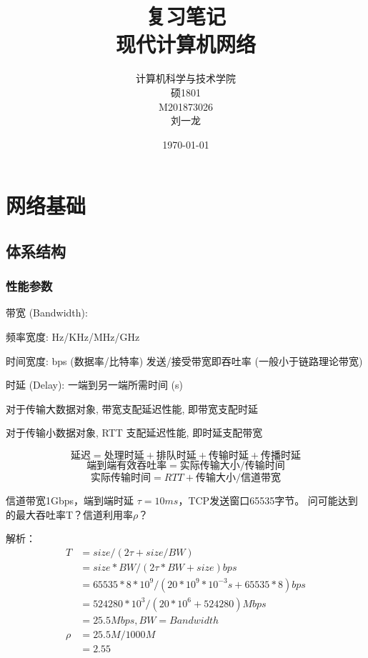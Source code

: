 \documentclass[UTF8,cs4size]{ctexart}
\title{复习笔记 \\ \bigskip \textbf{现代计算机网络}}
\author{计算机科学与技术学院\\ 硕1801\\ M201873026\\ 刘一龙}
\date{\today}
\begin{document}
\maketitle
\clearpage

\tableofcontents
\clearpage


\section{网络基础}
\subsection{体系结构}
\subsubsection{性能参数}
带宽 (Bandwidth):
\begin{compactitem}
  \item 频率宽度: Hz/KHz/MHz/GHz
  \item 时间宽度: bps (数据率/比特率) 发送/接受带宽即吞吐率 (一般小于链路理论带宽)
\end{compactitem}

时延 (Delay): 一端到另一端所需时间 (s)
\begin{compactitem}
  \item 对于传输大数据对象, 带宽支配延迟性能, 即带宽支配时延
  \item 对于传输小数据对象, RTT 支配延迟性能, 即时延支配带宽
\end{compactitem}

\begin{equation}
  \text{延迟} = \text{处理时延} + \text{排队时延} + \textbf{传输时延} + \textbf{传播时延}
\end{equation}
\begin{equation}
  \text{端到端有效吞吐率} = \text{实际传输大小}/\text{传输时间}
\end{equation}
\begin{equation}
  \text{实际传输时间} = RTT + \text{传输大小}/\text{信道带宽}
\end{equation}

信道带宽1Gbps，端到端时延 $\tau = 10ms$，TCP发送窗口65535字节。
问可能达到的最大吞吐率T？信道利用率$\rho$？

解析：
\begin{align*}
T & = size/(2\tau+size/BW) \\
& = size*BW/(2\tau*BW+size) bps \\
& = 65535*8*10^9/(20*10^9*10^{-3}s+65535*8)bps \\
& = 524280*10^3/(20 *10^6 +524280)Mbps \\
& = 25.5 Mbps, BW = Bandwidth \\
\rho & = 25.5M/1000M \\
& = 2.55
\end{align*}
\end{document}
